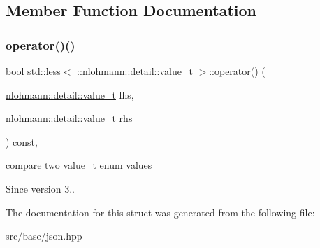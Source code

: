 \subsection{Member Function Documentation}
\mbox{\label{structstd_1_1less_3_01_1_1nlohmann_1_1detail_1_1value__t_01_4_a76d2a6c170cfd74f3b1882be1b5a6671}} 
\subsubsection{\texorpdfstring{operator()()}{operator()()}}
{\footnotesize\ttfamily bool std\+::less$<$ \+::\mbox{\hyperlink{namespacenlohmann_1_1detail_a1ed8fc6239da25abcaf681d30ace4985}{nlohmann\+::detail\+::value\+\_\+t}} $>$\+::operator() (\begin{DoxyParamCaption}\item[{\mbox{\hyperlink{namespacenlohmann_1_1detail_a1ed8fc6239da25abcaf681d30ace4985}{nlohmann\+::detail\+::value\+\_\+t}}}]{lhs,  }\item[{\mbox{\hyperlink{namespacenlohmann_1_1detail_a1ed8fc6239da25abcaf681d30ace4985}{nlohmann\+::detail\+::value\+\_\+t}}}]{rhs }\end{DoxyParamCaption}) const\hspace{0.3cm}{\ttfamily [inline]}, {\ttfamily [noexcept]}}



compare two value\+\_\+t enum values 

\begin{DoxySince}{Since}
version 3.. 
\end{DoxySince}


The documentation for this struct was generated from the following file\+:\begin{DoxyCompactItemize}
\item 
src/base/json.\+hpp\end{DoxyCompactItemize}
